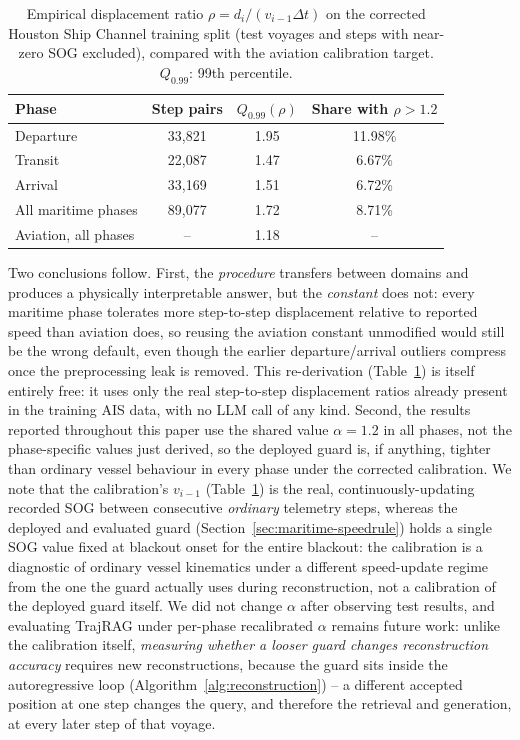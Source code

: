\begin{table}[t]
\centering
\caption{Empirical displacement ratio $\rho = d_i / (v_{i-1}\Delta t)$ on
the corrected Houston Ship Channel training split (test voyages and steps
with near-zero SOG excluded), compared with the aviation calibration
target. $Q_{0.99}$: 99th percentile.}
\label{tab:calibration}
\footnotesize
\begin{tabular}{lccc}
\toprule
Phase & Step pairs & $Q_{0.99}(\rho)$ & Share with $\rho > 1.2$ \\
\midrule
Departure & 33,821 & 1.95 & 11.98\% \\
Transit & 22,087 & 1.47 & 6.67\% \\
Arrival & 33,169 & 1.51 & 6.72\% \\
All maritime phases & 89,077 & 1.72 & 8.71\% \\
Aviation, all phases \citep{felendler2026trajrag} & -- & 1.18 & -- \\
\bottomrule
\end{tabular}
\end{table}

Two conclusions follow. First, the \emph{procedure} transfers between
domains and produces a physically interpretable answer, but the
\emph{constant} does not: every maritime phase tolerates more step-to-step
displacement relative to reported speed than aviation does, so reusing the
aviation constant unmodified would still be the wrong default, even though
the earlier departure/arrival outliers compress once the preprocessing leak
is removed. This re-derivation (Table~\ref{tab:calibration}) is itself
entirely free: it uses only the real step-to-step displacement ratios
already present in the training AIS data, with no LLM call of any kind.
Second, the results reported throughout this paper use the shared value
$\alpha = 1.2$ in all phases, not the phase-specific values just derived,
so the deployed guard is, if anything, tighter than ordinary vessel
behaviour in every phase under the corrected calibration. We note that the
calibration's $v_{i-1}$ (Table~\ref{tab:calibration}) is the real,
continuously-updating recorded SOG between consecutive \emph{ordinary}
telemetry steps, whereas the deployed and evaluated guard
(Section~\ref{sec:maritime-speedrule}) holds a single SOG value fixed at
blackout onset for the entire blackout: the calibration is a diagnostic of
ordinary vessel kinematics under a different speed-update regime from the
one the guard actually uses during reconstruction, not a calibration of the
deployed guard itself. We did not change $\alpha$ after observing test
results, and evaluating TrajRAG under per-phase recalibrated $\alpha$
remains future work: unlike the calibration itself, \emph{measuring whether
a looser guard changes reconstruction accuracy} requires new
reconstructions, because the guard sits inside the autoregressive loop
(Algorithm~\ref{alg:reconstruction}) -- a different accepted position at one
step changes the query, and therefore the retrieval and generation, at
every later step of that voyage.

